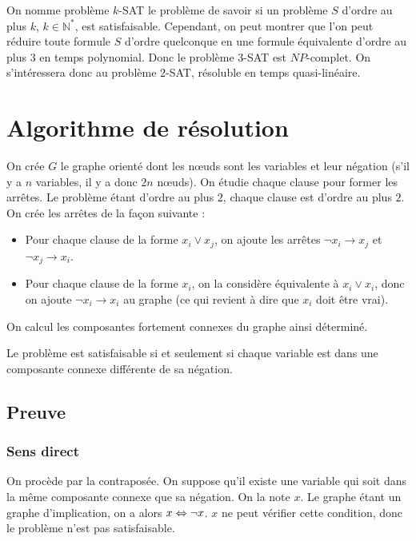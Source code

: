 On nomme problème $k$-SAT le problème de savoir si un problème $S$ d'ordre au
plus $k$, $k\in\mathbb{N}^*$, est satisfaisable. Cependant, on peut montrer
que l'on peut réduire toute formule $S$ d'ordre quelconque en une formule
équivalente d'ordre au plus $3$ en temps polynomial.
Donc le problème $3$-SAT est $NP$-complet. On s'intéressera donc au problème
$2$-SAT, résoluble en temps quasi-linéaire.

\section{Algorithme de résolution}
On crée $G$ le graphe orienté dont les nœuds sont les variables et leur
négation (s'il y a $n$ variables, il y a donc $2n$ nœuds). On étudie chaque
clause pour former les arrêtes. Le problème étant d'ordre au plus $2$, chaque
clause est d'ordre au plus $2$. On crée les arrêtes de la façon suivante :
\begin{itemize}
 \item Pour chaque clause de la forme $x_i \vee x_j$, on ajoute les arrêtes
       $\neg x_i \rightarrow x_j$ et $\neg x_j \rightarrow x_i$.
 \item Pour chaque clause de la forme $x_i$, on la considère équivalente à
       $x_i \vee x_i$, donc on ajoute $\neg x_i \rightarrow x_i$ au graphe (ce
       qui revient à dire que $x_i$ doit être vrai).
\end{itemize}

On calcul les composantes fortement connexes du graphe ainsi déterminé.

Le problème est satisfaisable si et seulement si chaque variable est dans une
composante connexe différente de sa négation.

\subsection{Preuve}
\subsubsection{Sens direct}
On procède par la contraposée. On suppose qu'il existe une variable qui soit
dans la même composante connexe que sa négation. On la note $x$. Le graphe
étant un graphe d'implication, on a alors $x \Leftrightarrow \neg x$. $x$ ne peut
vérifier cette condition, donc le problème n'est pas satisfaisable.

